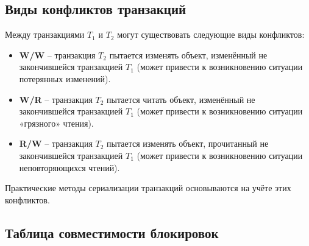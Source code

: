 \documentclass[a4paper,12pt]{article}
\begin{document}
\subsection{Виды конфликтов транзакций}

Между транзакциями $T_1$ и $T_2$ могут существовать следующие виды конфликтов:
\begin{itemize}
    \item \textbf{W/W} – транзакция $T_2$ пытается изменять объект, изменённый не закончившейся транзакцией $T_1$ (может привести к возникновению ситуации потерянных изменений).
    \item \textbf{W/R} – транзакция $T_2$ пытается читать объект, изменённый не закончившейся транзакцией $T_1$ (может привести к возникновению ситуации «грязного» чтения).
    \item \textbf{R/W} – транзакция $T_2$ пытается изменять объект, прочитанный не закончившейся транзакцией $T_1$ (может привести к возникновению ситуации неповторяющихся чтений).
\end{itemize}

Практические методы сериализации транзакций основываются на учёте этих конфликтов.

\subsection{Таблица совместимости блокировок}

\end{document}
